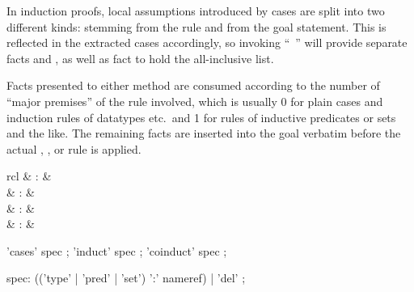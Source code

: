 \begin{isabellebody}
\begin{isamarkuptext}
  In induction proofs, local assumptions introduced by cases are split
  into two different kinds:  stemming from the rule and
   from the goal statement.  This is reflected in the
  extracted cases accordingly, so invoking ``\hyperlink{command.case}{\mbox{}}~'' will provide separate facts  and ,
  as well as fact  to hold the all-inclusive list.

  \medskip Facts presented to either method are consumed according to
  the number of ``major premises'' of the rule involved, which is
  usually 0 for plain cases and induction rules of datatypes etc.\ and
  1 for rules of inductive predicates or sets and the like.  The
  remaining facts are inserted into the goal verbatim before the
  actual , , or  rule is
  applied.%
\end{isamarkuptext}%
\isamarkuptrue%
%
\isamarkuptrue%
%
\begin{isamarkuptext}%
\begin{matharray}{rcl}
    \hypertarget{command.print-induct-rules}{\hyperlink{command.print-induct-rules}{\mbox{}}}\isa{{\isachardoublequote}\isactrlsup {\isacharasterisk}{\isachardoublequote}} & : &  \\
    \hypertarget{attribute.cases}{\hyperlink{attribute.cases}{\mbox{}}} & : &  \\
    \hypertarget{attribute.induct}{\hyperlink{attribute.induct}{\mbox{}}} & : &  \\
    \hypertarget{attribute.coinduct}{\hyperlink{attribute.coinduct}{\mbox{}}} & : &  \\
  \end{matharray}

  \begin{rail}
    'cases' spec
    ;
    'induct' spec
    ;
    'coinduct' spec
    ;

    spec: (('type' | 'pred' | 'set') ':' nameref) | 'del'
    ;
  \end{rail}

  \begin{description}


\end{description}
\end{isamarkuptext}
\end{isabellebody}
